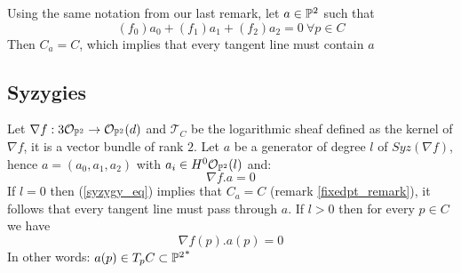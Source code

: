 \begin{remark}\label{fixedpt_remark}
Using the same notation from our last remark, let $a \in {\mathbb{P}^2}$ such that
\begin{equation}
({f_0}) a_0 + ({f_1}) a_1 + ({f_2}) a_2 = 0 \ \forall p \in C
\end{equation}
Then $C_a = C$, which implies that every tangent line must contain $a$
\end{remark}

\subsection{Syzygies}
\begin{remark}
Let $\nabla f: 3 \mathcal{O}_{\mathbb{P}^2} \to \mathcal{O}_{\mathbb{P}^2}(d)$ and $\mathcal{T}_C$ be the logarithmic sheaf defined as the kernel of $\nabla f$, it is a vector bundle of rank $2$. Let $a$ be a generator of degree $l$ of $Syz(\nabla f)$, hence $a = (a_0, a_1, a_2)$ with $a_i \in H^0 \mathcal{O}_{\mathbb{P}^2} (l)$ and:
\begin{equation}\label{syzygy_eq}
    \nabla f . a = 0
\end{equation}
If $l = 0$ then (\ref{syzygy_eq}) implies that $C_a = C$ (remark \ref{fixedpt_remark}), it follows that every tangent line must pass through $a$.
If $l>0$ then for every $p \in C$ we have
\begin{equation}
    \nabla f (p) . a(p) = 0
\end{equation}
In other words: $a(p) \in T_p C \subset {\mathbb{P}^2}^*$
\end{remark}
